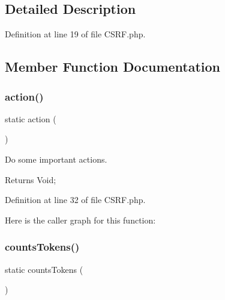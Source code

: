 \subsection{Detailed Description}


Definition at line 19 of file C\+S\+R\+F.\+php.



\subsection{Member Function Documentation}
\mbox{\label{class_zest_1_1_c_s_r_f_1_1_c_s_r_f_a6609de47ba599119a8e8bd3c8b51a66e}} 
\subsubsection{\texorpdfstring{action()}{action()}}
{\footnotesize\ttfamily static action (\begin{DoxyParamCaption}{ }\end{DoxyParamCaption})\hspace{0.3cm}{\ttfamily [static]}}

Do some important actions.

\begin{DoxyReturn}{Returns}
Void; 
\end{DoxyReturn}


Definition at line 32 of file C\+S\+R\+F.\+php.

Here is the caller graph for this function\+:
\mbox{\label{class_zest_1_1_c_s_r_f_1_1_c_s_r_f_ad3f7dbd55bdeb9ef76f6f2f7062ae5b3}} 
\subsubsection{\texorpdfstring{counts\+Tokens()}{countsTokens()}}
{\footnotesize\ttfamily static counts\+Tokens (\begin{DoxyParamCaption}{ }\end{DoxyParamCaption})\hspace{0.3cm}{\ttfamily [static]}}

